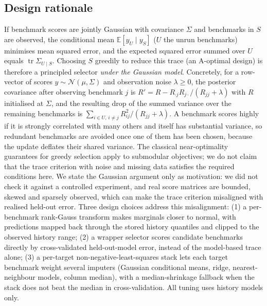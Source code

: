 \documentclass{article}
\begin{document}
\subsection{Design rationale}\label{sec:rationale}
If benchmark scores are jointly Gaussian with covariance $\Sigma$ and benchmarks in $S$ are observed, the conditional mean $\mathbb{E}[y_U\mid y_S]$ ($U$ the unrun benchmarks) minimises mean squared error, and the expected squared error summed over $U$ equals $\operatorname{tr}\Sigma_{U\mid S}$. Choosing $S$ greedily to reduce this trace (an A-optimal design) is therefore a principled selector \emph{under the Gaussian model}. Concretely, for a row-vector of scores $y\sim\mathcal{N}(\mu,\Sigma)$ and observation noise $\lambda\ge 0$, the posterior covariance after observing benchmark $j$ is $R'=R-R_{\cdot j}R_{j\cdot}/(R_{jj}+\lambda)$ with $R$ initialised at $\Sigma$, and the resulting drop of the summed variance over the remaining benchmarks is $\sum_{i\in U,\,i\neq j}R_{ij}^2/(R_{jj}+\lambda)$. A benchmark scores highly if it is strongly correlated with many others and itself has substantial variance, so redundant benchmarks are avoided once one of them has been chosen, because the update deflates their shared variance. The classical near-optimality guarantees for greedy selection \citep{Nemhauser1978Submodular,Krause2008NearOptimalSensor} apply to submodular objectives; we do not claim that the trace criterion with noise and missing data satisfies the required conditions here. We state the Gaussian argument only as motivation: we did not check it against a controlled experiment, and real score matrices are bounded, skewed and sparsely observed, which can make the trace criterion misaligned with realised held-out error. Three design choices address this misalignment:
(1) a per-benchmark rank-Gauss transform makes marginals closer to normal, with predictions mapped back through the stored history quantiles and clipped to the observed history range;
(2) a wrapper selector scores candidate benchmarks directly by cross-validated held-out-model error, instead of the model-based trace alone;
(3) a per-target non-negative-least-squares stack \citep{Lawson1995NNLS,Breiman1996Stacked} lets each target benchmark weight several imputers (Gaussian conditional means, ridge, nearest-neighbour models, column median), with a median-shrinkage fallback when the stack does not beat the median in cross-validation.
All tuning uses history models only.
\end{document}

